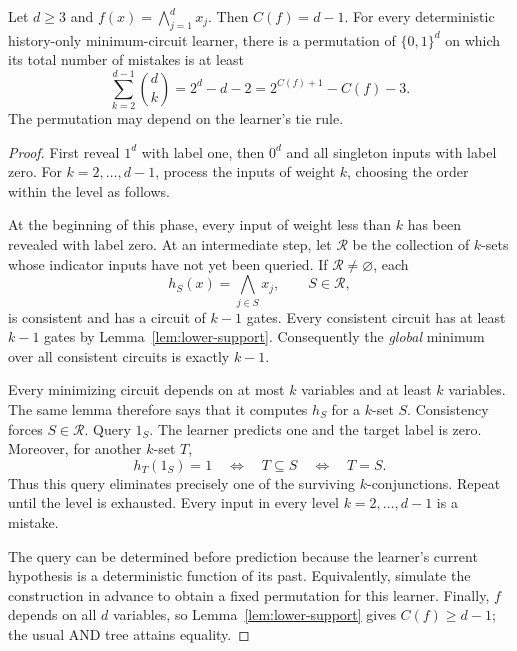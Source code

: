 \begin{theorem}
\label{thm:exact-occam-ladder}
Let $d\ge3$ and $f(x)=\bigwedge_{j=1}^d x_j$.
Then $C(f)=d-1$. For every deterministic history-only
minimum-circuit learner, there is a permutation of $\{0,1\}^d$
on which its total number of mistakes is at least
\[
  \sum_{k=2}^{d-1}\binom dk
  =2^d-d-2
  =2^{C(f)+1}-C(f)-3.
\]
The permutation may depend on the learner's tie rule.
\end{theorem}
\begin{proof}
First reveal $1^d$ with label one, then $0^d$ and all singleton
inputs with label zero. For $k=2,\ldots,d-1$, process the inputs of
weight $k$, choosing the order within the level as follows.

At the beginning of this phase, every input of weight less than $k$
has been revealed with label zero. At an intermediate step, let
$\mathcal R$ be the collection of $k$-sets whose indicator inputs
have not yet been queried. If $\mathcal R\ne\varnothing$, each
\[
  h_S(x)=\bigwedge_{j\in S}x_j,\qquad S\in\mathcal R,
\]
is consistent and has a circuit of $k-1$ gates. Every consistent
circuit has at least $k-1$ gates by Lemma~\ref{lem:lower-support}.
Consequently the \emph{global} minimum over all consistent circuits
is exactly $k-1$.

Every minimizing circuit depends on at most $k$ variables and at
least $k$ variables. The same lemma therefore says that it computes
$h_S$ for a $k$-set $S$. Consistency forces $S\in\mathcal R$.
Query $1_S$. The learner predicts one and the target label is zero.
Moreover, for another $k$-set $T$,
\[
  h_T(1_S)=1\quad\Longleftrightarrow\quad T\subseteq S
  \quad\Longleftrightarrow\quad T=S.
\]
Thus this query eliminates precisely one of the surviving
$k$-conjunctions. Repeat until the level is exhausted. Every input
in every level $k=2,\ldots,d-1$ is a mistake.

The query can be determined before prediction because the learner's
current hypothesis is a deterministic function of its past.
Equivalently, simulate the construction in advance to obtain a
fixed permutation for this learner. Finally, $f$ depends on all
$d$ variables, so Lemma~\ref{lem:lower-support} gives
$C(f)\ge d-1$; the usual AND tree attains equality.
\end{proof}

